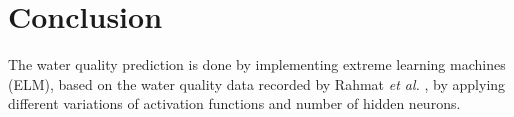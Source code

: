 \documentclass[journal,comsoc]{IEEEtran}
\let\MYoriglatexcaption\caption
\renewcommand{\caption}[2][\relax]{\MYoriglatexcaption[#2]{#2}}
\begin{document}
%






\section{Conclusion}
The water quality prediction is done by implementing extreme learning machines (ELM), based on the water quality data recorded by Rahmat {\it et al.} \cite{Rahmat16} , by applying different variations of activation functions and number of hidden neurons.






\end{document}
